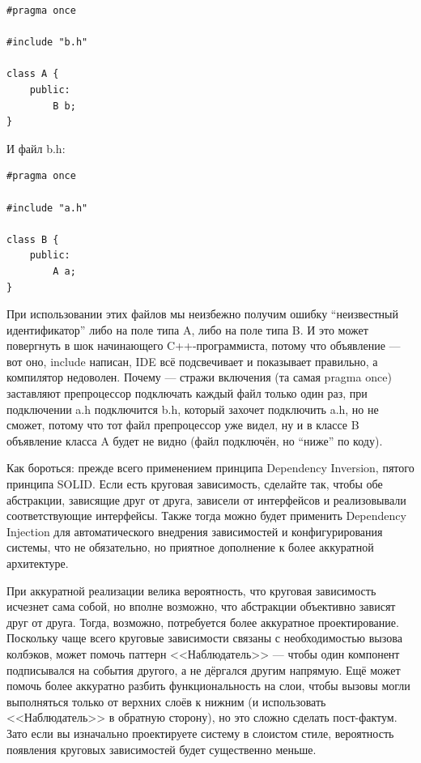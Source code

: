 \documentclass[a5paper]{article}
\begin{document}
\begin{verbatim}
#pragma once

#include "b.h"

class A {
    public:
        B b;
}
\end{verbatim}

И файл b.h:

\begin{verbatim}
#pragma once

#include "a.h"

class B {
    public:
        A a;
}
\end{verbatim}

При использовании этих файлов мы неизбежно получим ошибку ``неизвестный идентификатор'' либо на поле типа A, либо на поле типа B. И это может повергнуть в шок начинающего C++-программиста, потому что объявление --- вот оно, include написан, IDE всё подсвечивает и показывает правильно, а компилятор недоволен. Почему --- стражи включения (та самая pragma once) заставляют препроцессор подключать каждый файл только один раз, при подключении a.h подключится b.h, который захочет подключить a.h, но не сможет, потому что тот файл препроцессор уже видел, ну и в классе B объявление класса A будет не видно (файл подключён, но ``ниже'' по коду).

Как бороться: прежде всего применением принципа Dependency Inversion, пятого принципа SOLID. Если есть круговая зависимость, сделайте так, чтобы обе абстракции, зависящие друг от друга, зависели от интерфейсов и реализовывали соответствующие интерфейсы. Также тогда можно будет применить Dependency Injection для автоматического внедрения зависимостей и конфигурирования системы, что не обязательно, но приятное дополнение к более аккуратной архитектуре.

При аккуратной реализации велика вероятность, что круговая зависимость исчезнет сама собой, но вполне возможно, что абстракции объективно зависят друг от друга. Тогда, возможно, потребуется более аккуратное проектирование. Поскольку чаще всего круговые зависимости связаны с необходимостью вызова колбэков, может помочь паттерн <<Наблюдатель>> --- чтобы один компонент подписывался на события другого, а не дёргался другим напрямую. Ещё может помочь более аккуратно разбить функциональность на слои, чтобы вызовы могли выполняться только от верхних слоёв к нижним (и использовать <<Наблюдатель>> в обратную сторону), но это сложно сделать пост-фактум. Зато если вы изначально проектируете систему в слоистом стиле, вероятность появления круговых зависимостей будет существенно меньше.
\end{document}
